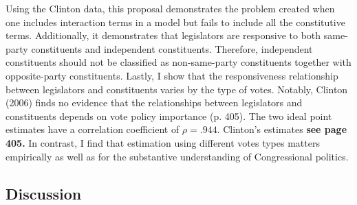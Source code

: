 \documentclass[10pt,letterpaper]{article}
\begin{document}
Using the Clinton data, this proposal demonstrates the problem created when one includes interaction terms in a model but fails to include all the constitutive terms. Additionally, it demonstrates that legislators are responsive to both same-party constituents and independent constituents. Therefore, independent constituents should not be classified as non-same-party constituents together with opposite-party constituents. Lastly, I show that the responsiveness relationship between legislators and constituents varies by the type of votes. Notably, Clinton (2006) finds no evidence that the relationships between legislators and constituents depends on vote policy importance (p. 405). The two ideal point estimates have a correlation coefficient of $\rho = .944$. Clinton's estimates \textbf{see page 405.} In contrast, I find that estimation using different votes types matters empirically as well as for the substantive understanding of Congressional politics.

\subsection{Discussion}
\end{document}
